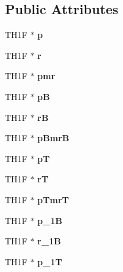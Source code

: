 \subsection*{Public Attributes}
\begin{DoxyCompactItemize}
\item 
\mbox{\label{classhists_a41afed096ec22360010c5394780ae311}} 
T\+H1F $\ast$ {\bfseries p}
\item 
\mbox{\label{classhists_aff8415e0daed67934f5b5d22dc2833e9}} 
T\+H1F $\ast$ {\bfseries r}
\item 
\mbox{\label{classhists_a7deeb53d1622c43f1de1459c37554181}} 
T\+H1F $\ast$ {\bfseries pmr}
\item 
\mbox{\label{classhists_a7e962900e2acf6aad5a34b37e8f7120b}} 
T\+H1F $\ast$ {\bfseries pB}
\item 
\mbox{\label{classhists_ade9c18d36c628ca168263749aec46881}} 
T\+H1F $\ast$ {\bfseries rB}
\item 
\mbox{\label{classhists_a0ebe4e7e00a621e903d2badca471bb76}} 
T\+H1F $\ast$ {\bfseries p\+BmrB}
\item 
\mbox{\label{classhists_a37b47338868009d91a4a9faee7d00d44}} 
T\+H1F $\ast$ {\bfseries pT}
\item 
\mbox{\label{classhists_a61cf4fec0530bd16c881acc84a9f74d6}} 
T\+H1F $\ast$ {\bfseries rT}
\item 
\mbox{\label{classhists_a7e36a011237a42752b9f0e7b464925a8}} 
T\+H1F $\ast$ {\bfseries p\+TmrT}
\item 
\mbox{\label{classhists_ab1c1ddba953f87c0f4c32279bc9485d6}} 
T\+H1F $\ast$ {\bfseries p\+\_\+1B}
\item 
\mbox{\label{classhists_ad287fcf0e40907decc131b3bcbb7ff08}} 
T\+H1F $\ast$ {\bfseries r\+\_\+1B}
\item 
\mbox{\label{classhists_ab0877e25719159c845f5134b66d8ef57}} 
T\+H1F $\ast$ {\bfseries p\+\_\+1T}

\end{DoxyCompactItemize}
